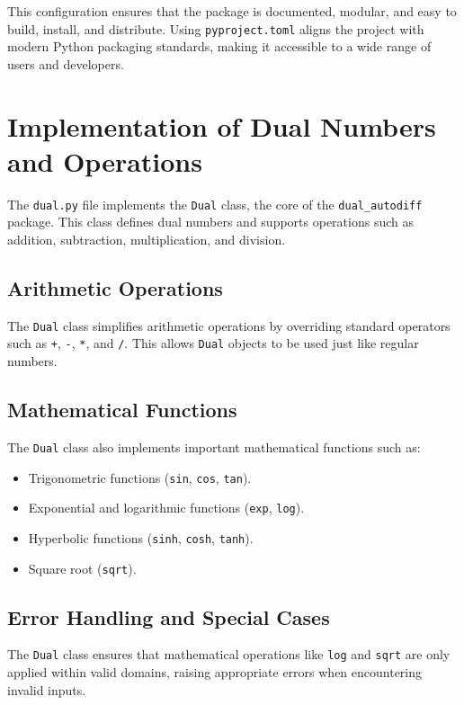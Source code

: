 \documentclass[a4paper,12pt]{article}
\begin{document}
    This configuration ensures that the package is documented, modular, and easy to build, install, and distribute. Using \texttt{pyproject.toml} aligns the project with modern Python packaging standards, making it accessible to a wide range of users and developers.
    

    \section{Implementation of Dual Numbers and Operations}

    The \texttt{dual.py} file implements the \texttt{Dual} class, the core of the \texttt{dual\_autodiff} package. This class defines dual numbers and supports operations such as addition, subtraction, multiplication, and division.
    
    \subsection{Arithmetic Operations}
    The \texttt{Dual} class simplifies arithmetic operations by overriding standard operators such as \texttt{+}, \texttt{-}, \texttt{*}, and \texttt{/}. This allows \texttt{Dual} objects to be used just like regular numbers.
    
    \subsection{Mathematical Functions}
    The \texttt{Dual} class also implements important mathematical functions such as:
    \begin{itemize}
        \item Trigonometric functions (\texttt{sin}, \texttt{cos}, \texttt{tan}).
        \item Exponential and logarithmic functions (\texttt{exp}, \texttt{log}).
        \item Hyperbolic functions (\texttt{sinh}, \texttt{cosh}, \texttt{tanh}).
        \item Square root (\texttt{sqrt}).
    \end{itemize}
    
    \subsection{Error Handling and Special Cases}
    The \texttt{Dual} class ensures that mathematical operations like \texttt{log} and \texttt{sqrt} are only applied within valid domains, raising appropriate errors when encountering invalid inputs.
    
\end{document}
